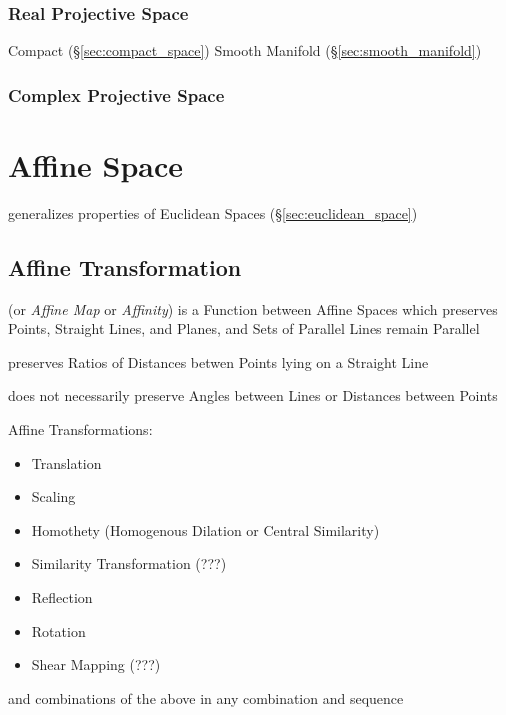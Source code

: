 \subsubsection{Real Projective Space}\label{sec:real_projective_space}

Compact (\S\ref{sec:compact_space}) Smooth Manifold
(\S\ref{sec:smooth_manifold})



\subsubsection{Complex Projective Space}
\label{sec:complex_projective_space}



\section{Affine Space}\label{sec:affine_space}


generalizes properties of Euclidean Spaces (\S\ref{sec:euclidean_space})



\subsection{Affine Transformation}\label{sec:affine_transformation}

(or \emph{Affine Map} or \emph{Affinity}) is a Function between Affine
Spaces which preserves Points, Straight Lines, and Planes, and Sets of
Parallel Lines remain Parallel

preserves Ratios of Distances betwen Points lying on a Straight Line

does not necessarily preserve Angles between Lines or Distances
between Points

Affine Transformations:
\begin{itemize}
\item Translation
\item Scaling
\item Homothety (Homogenous Dilation or Central Similarity)
\item Similarity Transformation (???)
\item Reflection
\item Rotation
\item Shear Mapping (???)
\end{itemize}
and combinations of the above in any combination and sequence



